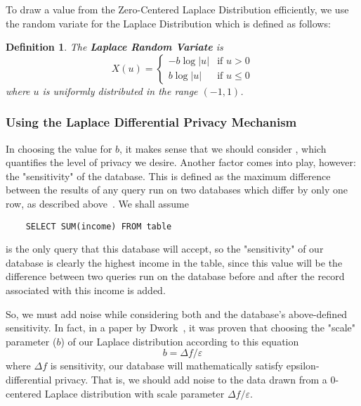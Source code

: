 \documentclass[conference,11pt]{IEEEtran}
\newtheorem{definition}{Definition}
\begin{document}
To draw a value from the Zero-Centered Laplace Distribution efficiently, we use
the random variate for the Laplace Distribution which is defined as follows:
\begin{mdframed}
    \begin{definition}\label{def:laplace-variate}
        The \textbf{Laplace Random Variate} is
        \begin{equation}
            X(u) = \left\{\begin{matrix}
                    -b \log|u| & \text{if }u > 0
                    \\[8pt]
                    b \log|u| & \text{if }u \leq 0
            \end{matrix}\right.
        \end{equation}
        where $u$ is uniformly distributed in the range $(-1, 1)$.
    \end{definition}
\end{mdframed}

\subsubsection{Using the Laplace Differential Privacy Mechanism}\label{sec:using-laplace-dp}
In choosing the value for $b$, it makes sense that we should consider
\textepsilon, which quantifies the level of privacy we desire. Another factor
comes into play, however: the "sensitivity" of the database. This is defined as
the maximum difference between the results of any query run on two databases
which differ by only one row, as described above~\cite{Atockar:2014}. We shall
assume

\begin{verbatim}
    SELECT SUM(income) FROM table
\end{verbatim}
is the only query that this database will accept, so the "sensitivity" of our
database is clearly the highest income in the table, since this value will be
the difference between two queries run on the database before and after the
record associated with this income is added.

So, we must add noise while considering both {\textepsilon} and the database's
above-defined sensitivity. In fact, in a paper by
Dwork~\cite{Dwork:2011:private-data-analysis}, it was proven that choosing the
"scale" parameter ($b$) of our Laplace distribution according to this equation
\begin{equation}
    b = {\Delta}f/\varepsilon
\end{equation}
where ${\Delta}f$ is sensitivity, our database will mathematically satisfy
epsilon-differential privacy. That is, we should add noise to the data drawn
from a 0-centered Laplace distribution with scale parameter
${\Delta}f/\varepsilon$.
\end{document}
